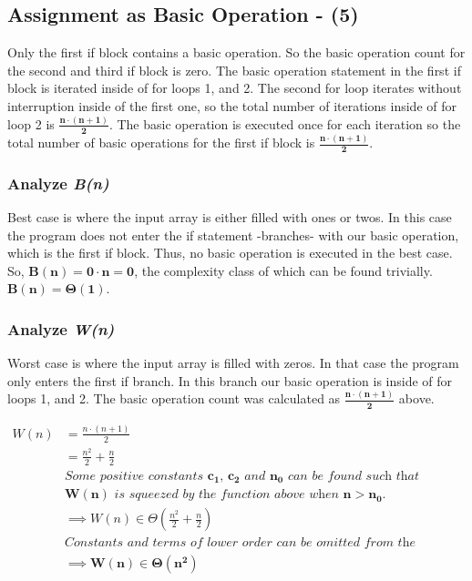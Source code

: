 \documentclass[10pt]{article}
\begin{document}
\subsection{Assignment as Basic Operation - (5)}
Only the first if block contains a basic operation. So the basic operation count for the second and third if block is zero. The basic operation statement in the first if block is iterated inside of for loops 1, and 2. The second for loop iterates without interruption inside of the first one, so the total number of iterations inside of for loop 2 is $\mathbf{\frac{n \cdot (n+1)}{2}}$. The basic operation is executed once for each iteration so the total number of basic operations for the first if block is $\mathbf{\frac{n \cdot (n+1)}{2}}$. 

\subsubsection{Analyze \textit{B(n)}}
Best case is where the input array is either filled with ones or twos. In this case the program does not enter the if statement -branches- with our basic operation, which is the first if block. Thus, no basic operation is executed in the best case. So, $\mathbf{B(n) = 0 \cdot n = 0}$, the complexity class of which can be found trivially. $\mathbf{B(n) = \Theta(1)}$.

\subsubsection{Analyze \textit{W(n)}}
Worst case is where the input array is filled with zeros. In that case the program only enters the first if branch. In this branch our basic operation is inside of for loops 1, and 2. The basic operation count was calculated as $\mathbf{\frac{n \cdot (n+1)}{2}}$ above.

\begin{align*}
W(n) &= \frac{n \cdot (n+1)}{2} &&\\
 &= \frac{n^2}{2} + \frac{n}{2} && \\
 &\textit{Some positive constants $\mathbf{c_{1}}$, $\mathbf{c_{2}}$ and $\mathbf{n_{0}}$ can be found such that} && \\ 
 &\textit{$\mathbf{W(n)}$ is squeezed by the function above when $\mathbf{n > n_{0}}$.} && \\
 &\implies W(n) \in \Theta (\frac{n^2}{2} + \frac{n}{2}) && \\
&\textit{Constants and terms of lower order can be omitted from the complexity class.} \\
&\implies \mathbf{W(n) \boldsymbol{\in} \Theta (n^2)} && \\
\end{align*}
\end{document}

